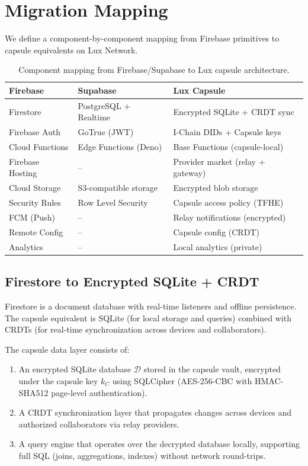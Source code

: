 \section{Migration Mapping}
\label{sec:mapping}

We define a component-by-component mapping from Firebase primitives to
capsule equivalents on Lux Network.

\begin{table}[H]
\centering
\caption{Component mapping from Firebase/Supabase to Lux capsule architecture.}
\label{tab:mapping}
\begin{tabular}{p{3.5cm}p{4.5cm}p{5cm}}
\toprule
\textbf{Firebase} & \textbf{Supabase} & \textbf{Lux Capsule} \\
\midrule
Firestore & PostgreSQL + Realtime & Encrypted SQLite + CRDT sync \\
Firebase Auth & GoTrue (JWT) & I-Chain DIDs + Capsule keys \\
Cloud Functions & Edge Functions (Deno) & Base Functions (capsule-local) \\
Firebase Hosting & -- & Provider market (relay + gateway) \\
Cloud Storage & S3-compatible storage & Encrypted blob storage \\
Security Rules & Row Level Security & Capsule access policy (TFHE) \\
FCM (Push) & -- & Relay notifications (encrypted) \\
Remote Config & -- & Capsule config (CRDT) \\
Analytics & -- & Local analytics (private) \\
\bottomrule
\end{tabular}
\end{table}

\subsection{Firestore to Encrypted SQLite + CRDT}

Firestore is a document database with real-time listeners and
offline persistence. The capsule equivalent is SQLite (for local
storage and queries) combined with CRDTs (for real-time
synchronization across devices and collaborators).

\begin{definition}
The capsule data layer consists of:
\begin{enumerate}
    \item An encrypted SQLite database $\mathcal{D}$ stored in the capsule
    vault, encrypted under the capsule key $k_C$ using SQLCipher
    \cite{zetetic2024sqlcipher} (AES-256-CBC with HMAC-SHA512 page-level
    authentication).
    \item A CRDT synchronization layer that propagates changes across
    devices and authorized collaborators via relay providers.
    \item A query engine that operates over the decrypted database locally,
    supporting full SQL (joins, aggregations, indexes) without network
    round-trips.
\end{enumerate}
\end{definition}

